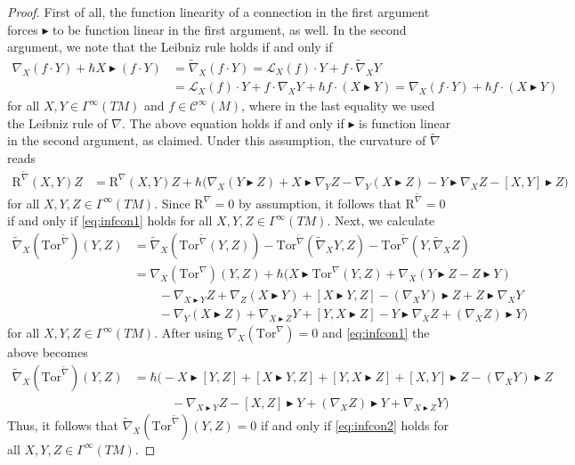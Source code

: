 \documentclass[10pt]{article}
\theoremstyle{definition}
\newcommand{\bt}{\blacktriangleright}
\begin{document}
\begin{proof}
First of all, the function linearity of a connection in the first argument forces $\bt$ to be function linear in the first argument, as well. In the second argument, we note that the Leibniz rule holds if and only if
\begin{align*}
    \nabla_X(f\cdot Y)
    +\hbar X\bt(f\cdot Y)
    &=\tilde{\nabla}_X(f\cdot Y)
    =\mathscr{L}_X(f)\cdot Y
    +f\cdot\tilde{\nabla}_XY\\
    &=\mathscr{L}_X(f)\cdot Y
    +f\cdot\nabla_XY
    +\hbar f\cdot(X\bt Y)
    =\nabla_X(f\cdot Y)
    +\hbar f\cdot(X\bt Y)
\end{align*}
for all $X,Y\in\Gamma^\infty(TM)$ and $f\in\mathscr{C}^\infty(M)$, where in the last equality we used the Leibniz rule of $\nabla$. The above equation holds if and only if $\bt$ is function linear in the second argument, as claimed. Under this assumption, the curvature of $\tilde{\nabla}$ reads
\begin{align*}
    \mathrm{R}^{\tilde{\nabla}}(X,Y)Z
    &=\mathrm{R}^{\nabla}(X,Y)Z+\hbar\big(\nabla_X(Y\bt Z)
    +X\bt\nabla_YZ
    -\nabla_Y(X\bt Z)
    -Y\bt\nabla_XZ
    -[X,Y]\bt Z\big)
\end{align*}
for all $X,Y,Z\in\Gamma^\infty(TM)$. Since $\mathrm{R}^\nabla=0$ by assumption, it follows that $\mathrm{R}^{\tilde{\nabla}}=0$ if and only if \eqref{eq:infcon1} holds for all $X,Y,Z\in\Gamma^\infty(TM)$. Next, we calculate
\begin{align*}
    \tilde{\nabla}_X(\mathrm{Tor}^{\tilde{\nabla}})(Y,Z)
    &=\tilde{\nabla}_X(\mathrm{Tor}^{\tilde{\nabla}}(Y,Z))
    -\mathrm{Tor}^{\tilde{\nabla}}(\tilde{\nabla}_XY,Z)
    -\mathrm{Tor}^{\tilde{\nabla}}(Y,\tilde{\nabla}_XZ)\\
    &=\nabla_X(\mathrm{Tor}^\nabla)(Y,Z)
    +\hbar\bigg(X\bt\mathrm{Tor}^\nabla(Y,Z)
    +\nabla_X(Y\bt Z-Z\bt Y)\\
    &\qquad-\nabla_{X\bt Y}Z+\nabla_Z(X\bt Y)+[X\bt Y,Z]-(\nabla_XY)\bt Z+Z\bt\nabla_XY\\
    &\qquad-\nabla_Y(X\bt Z)+\nabla_{X\bt Z}Y+[Y,X\bt Z]-Y\bt\nabla_XZ+(\nabla_XZ)\bt Y\bigg)
\end{align*}
for all $X,Y,Z\in\Gamma^\infty(TM)$. After using $\nabla_X(\mathrm{Tor}^\nabla)=0$ and \eqref{eq:infcon1} the above becomes
\begin{align*}
    \tilde{\nabla}_X(\mathrm{Tor}^{\tilde{\nabla}})(Y,Z)
    &=\hbar\bigg(-X\bt[Y,Z]+[X\bt Y,Z]+[Y,X\bt Z]+[X,Y]\bt Z-(\nabla_XY)\bt Z\\
    &\qquad\quad-\nabla_{X\bt Y}Z-[X,Z]\bt Y+(\nabla_XZ)\bt Y+\nabla_{X\bt Z}Y\bigg)
\end{align*}
Thus, it follows that $\tilde{\nabla}_X(\mathrm{Tor}^{\tilde{\nabla}})(Y,Z)=0$ if and only if \eqref{eq:infcon2} holds for all $X,Y,Z\in\Gamma^\infty(TM)$.


\end{proof}
\end{document}
